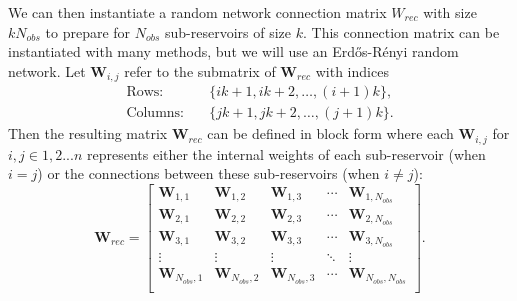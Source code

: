 We can then instantiate a random network connection matrix $W_{rec}$ with size $kN_{obs}$ to prepare for $N_{obs}$ sub-reservoirs of size $k$. This connection matrix can be instantiated with many methods, but we will use an Erd\H{o}s-R\'enyi random network. Let $\mathbf{W}_{i,j}$ refer to the submatrix of $\mathbf{W}_{rec}$ with indices
\begin{align*}
    \text{Rows:}\quad& \{ ik + 1, ik + 2, \dots, (i+1)k \}, \\
    \text{Columns:}\quad& \{ jk + 1, jk + 2, \dots, (j+1)k \}.
\end{align*}
Then the resulting matrix $\mathbf{W}_{rec}$ can be defined in block form where each $\mathbf{W}_{i,j}$ for $i,j \in 1,2...n$ represents either the internal weights of each sub-reservoir (when $i=j$) or the connections between these sub-reservoirs (when $i\neq j$):
\[
    \mathbf{W}_{rec} = 
    \begin{bmatrix}
    \mathbf{W}_{1,1} & \mathbf{W}_{1,2} & \mathbf{W}_{1,3} & \cdots & \mathbf{W}_{1,N_{obs}} \\
    \mathbf{W}_{2,1} & \mathbf{W}_{2,2} & \mathbf{W}_{2,3} & \cdots & \mathbf{W}_{2,N_{obs}} \\
    \mathbf{W}_{3,1} & \mathbf{W}_{3,2} & \mathbf{W}_{3,3} & \cdots & \mathbf{W}_{3,N_{obs}} \\
    \vdots & \vdots & \vdots & \ddots & \vdots \\
    \mathbf{W}_{N_{obs},1} & \mathbf{W}_{N_{obs},2} & \mathbf{W}_{N_{obs},3} & \cdots & \mathbf{W}_{N_{obs},N_{obs}} \\
    \end{bmatrix}.
\]

